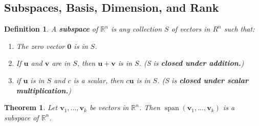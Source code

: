 \documentclass{article}
\newtheorem*{theorem*}{Theorem}
\newtheorem*{definition*}{Definition}
\newcommand{\vu}{\mathbf{u}}
\newcommand{\vv}{\mathbf{v}}
\begin{document}
\subsection{Subspaces, Basis, Dimension, and Rank}
\begin{definition*}
	A \textit{\textbf{subspace}} of $\mathbb{R}^n$ is any collection $S$ of vectors in $R^n$ such that:
	\begin{enumerate}
		\item The zero vector $\mathbf{0}$ is in $S$.
		\item If $\vu$ and $\vv$ are in $S$, then $\vu+\vv$ is in $S$. (S is \textit{\textbf{closed
				      under addition.}})
		\item if $\vu$ is in $S$ and $c$ is a scalar, then $c\vu$ is in $S$. (S is \textit{
			      \textbf{closed under scalar multiplication.}})
	\end{enumerate}
\end{definition*}
\begin{theorem*}
	Let $\vv_1, \ldots, \vv_k$ be vectors in $\mathbb{R}^n$. Then $\operatorname{span}(\vv_1, \ldots,
		\vv_k)$ is a subspace of $\mathbb{R}^n$.
\end{theorem*}
\end{document}
